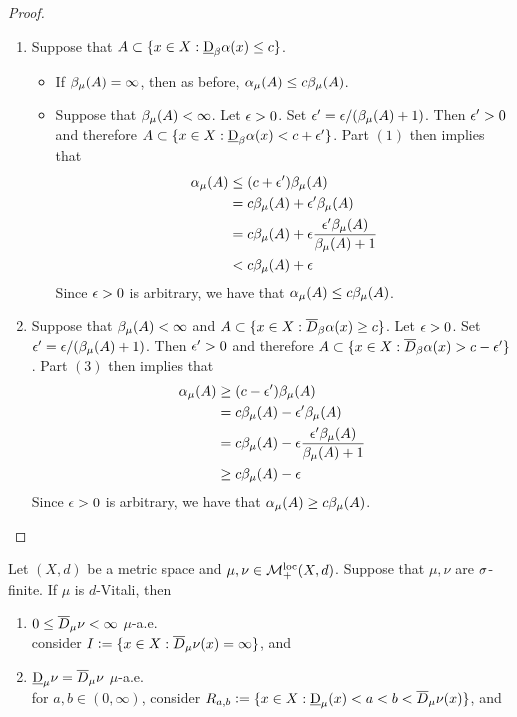 \documentclass{book}
\begin{document}
	\begin{proof}\
		\begin{enumerate}
			\item Suppose that $A \subset \{x \in X: \underbar{D}_{\beta}\alpha(x) \leq c\}$. 
			\begin{itemize}
				\item If $\beta_{\mu}(A) = \infty$, then as before, $	\alpha_{\mu}(A) \leq c \beta_{\mu}(A)$. 
				\item Suppose that $\beta_{\mu}(A) < \infty$. Let $\epsilon > 0$. Set $\epsilon' = \epsilon /(\beta_{\mu}(A) + 1)$. Then $\epsilon' > 0$ and therefore $A \subset \{x \in X: \underbar{D}_{\beta}\alpha(x) < c + \epsilon' \}$. Part $(1)$ then implies that  
				\begin{align*}
					\alpha_{\mu}(A) 
					& \leq (c+ \epsilon') \beta_{\mu}(A) \\
					& = c \beta_{\mu}(A) + \epsilon'\beta_{\mu}(A) \\
					& = c \beta_{\mu}(A) + \epsilon \frac{\epsilon'\beta_{\mu}(A) }{\beta_{\mu}(A) + 1} \\
					& < c \beta_{\mu}(A) + \epsilon
				\end{align*}
				Since $\epsilon > 0$ is arbitrary, we have that $\alpha_{\mu}(A) \leq c \beta_{\mu}(A)$.
			\end{itemize}
			\item Suppose that $\beta_{\mu}(A) < \infty$ and $A \subset \{x \in X: \overline{D}_{\beta}\alpha(x) \geq c\}$. Let $\epsilon > 0$. Set $\epsilon' = \epsilon /(\beta_{\mu}(A) + 1)$. Then $\epsilon' > 0$ and therefore $A \subset \{x \in X: \overline{D}_{\beta}\alpha(x) > c - \epsilon' \}$. Part $(3)$ then implies that  
			\begin{align*}
				\alpha_{\mu}(A) 
				& \geq (c - \epsilon') \beta_{\mu}(A) \\
				& = c \beta_{\mu}(A) - \epsilon'\beta_{\mu}(A) \\
				& = c \beta_{\mu}(A) - \epsilon \frac{\epsilon'\beta_{\mu}(A) }{\beta_{\mu}(A) + 1} \\
				& \geq c \beta_{\mu}(A) - \epsilon 
			\end{align*}
			Since $\epsilon > 0$ is arbitrary, we have that $\alpha_{\mu}(A) \geq c \beta_{\mu}(A)$.
		\end{enumerate}
	\end{proof}

	
	\begin{ex} 
		Let $(X, d)$ be a metric space and $\mu, \nu \in \mathcal{M}_+^{\text{loc}}(X, d)$. Suppose that $\mu, \nu$ are $\sigma$-finite. If $\mu$ is $d$-Vitali, then 
		\begin{enumerate}
			\item $0 \leq \overline{D}_{\mu}\nu < \infty$ $\mu$-a.e.\\
			 consider $I \vcentcolon= \{x \in X: \overline{D}_{\mu} \nu (x) = \infty\}$,   and 
			\item $\underbar{D}_{\mu}\nu = \overline{D}_{\mu}\nu$ $\mu$-a.e. \\
			 for $a,b \in (0,\infty)$, consider $R_{a,b} \vcentcolon= \{x \in X: \underbar{D}_{\mu}(x) < a < b < \overline{D}_{\mu} \nu (x)\}$,  and 
		\end{enumerate}
	\end{ex}
	
\end{document}
